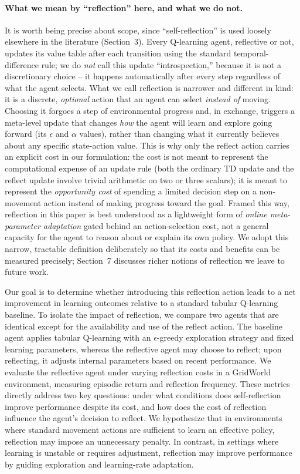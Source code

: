 \documentclass[11pt]{article}
\begin{document}
\paragraph{What we mean by ``reflection'' here, and what we do not.} It is worth being precise about scope, since ``self-reflection'' is used loosely elsewhere in the literature (Section~3). Every Q-learning agent, reflective or not, updates its value table after each transition using the standard temporal-difference rule; we do \emph{not} call this update ``introspection,'' because it is not a discretionary choice -- it happens automatically after every step regardless of what the agent selects. What we call reflection is narrower and different in kind: it is a discrete, \emph{optional} action that an agent can select \emph{instead of} moving. Choosing it forgoes a step of environmental progress and, in exchange, triggers a meta-level update that changes \emph{how} the agent will learn and explore going forward (its $\epsilon$ and $\alpha$ values), rather than changing what it currently believes about any specific state-action value. This is why only the reflect action carries an explicit cost in our formulation: the cost is not meant to represent the computational expense of an update rule (both the ordinary TD update and the reflect update involve trivial arithmetic on two or three scalars); it is meant to represent the \emph{opportunity cost} of spending a limited decision step on a non-movement action instead of making progress toward the goal. Framed this way, reflection in this paper is best understood as a lightweight form of \emph{online meta-parameter adaptation} gated behind an action-selection cost, not a general capacity for the agent to reason about or explain its own policy. We adopt this narrow, tractable definition deliberately so that its costs and benefits can be measured precisely; Section~7 discusses richer notions of reflection we leave to future work.

Our goal is to determine whether introducing this reflection action leads to a net improvement in learning outcomes relative to a standard tabular Q-learning baseline. To isolate the impact of reflection, we compare two agents that are identical except for the availability and use of the reflect action. The baseline agent applies tabular Q-learning with an $\epsilon$-greedy exploration strategy and fixed learning parameters, whereas the reflective agent may choose to reflect; upon reflecting, it adjusts internal parameters based on recent performance. We evaluate the reflective agent under varying reflection costs in a GridWorld environment, measuring episodic return and reflection frequency. These metrics directly address two key questions: under what conditions does self-reflection improve performance despite its cost, and how does the cost of reflection influence the agent's decision to reflect. We hypothesize that in environments where standard movement actions are sufficient to learn an effective policy, reflection may impose an unnecessary penalty. In contrast, in settings where learning is unstable or requires adjustment, reflection may improve performance by guiding exploration and learning-rate adaptation.
\end{document}
